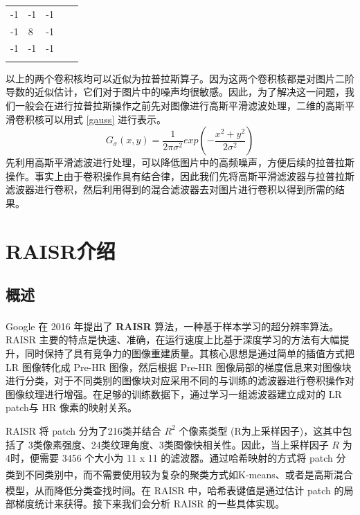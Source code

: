 \documentclass[12pt, a4paper, oneside]{ctexbook}
\begin{document}
	\begin{table}[h]
		\centering
		\begin{tabular}{lllll}
			\cline{1-3}
			\multicolumn{1}{|l|}{-1} & \multicolumn{1}{l|}{-1} & \multicolumn{1}{l|}{-1} &  &  \\ \cline{1-3}
			\multicolumn{1}{|l|}{-1} & \multicolumn{1}{l|}{8}  & \multicolumn{1}{l|}{-1} &  &  \\ \cline{1-3}
			\multicolumn{1}{|l|}{-1} & \multicolumn{1}{l|}{-1} & \multicolumn{1}{l|}{-1} &  &  \\ \cline{1-3}
			&                         &                         &  & 
		\end{tabular}
	\end{table}
	以上的两个卷积核均可以近似为拉普拉斯算子。因为这两个卷积核都是对图片二阶导数的近似估计，它们对于图片中的噪声均很敏感。因此，为了解决这一问题，我们一般会在进行拉普拉斯操作之前先对图像进行高斯平滑滤波处理，二维的高斯平滑卷积核可以用式 \ref{gauss} 进行表示。
	\begin{equation}	\label{gauss}
		G_\sigma (x,y)=\frac{1}{2\pi \sigma ^2} exp(-\frac{x^2+y^2}{2\sigma ^2}) 
	\end{equation}
	先利用高斯平滑滤波进行处理，可以降低图片中的高频噪声，方便后续的拉普拉斯操作。事实上由于卷积操作具有结合律，因此我们先将高斯平滑滤波器与拉普拉斯滤波器进行卷积，然后利用得到的混合滤波器去对图片进行卷积以得到所需的结果。
	\section{RAISR介绍}
	\subsection{概述}
	Google 在 2016 年提出了 \textbf{RAISR}\textsuperscript{\cite{1}} 算法，一种基于样本学习的超分辨率算法。RAISR 主要的特点是快速、准确，在运行速度上比基于深度学习的方法有大幅提升，同时保持了具有竞争力的图像重建质量。其核心思想是通过简单的插值方式把 LR 图像转化成 Pre-HR 图像，然后根据 Pre-HR 图像局部的梯度信息来对图像块进行分类，对于不同类别的图像块对应采用不同的与训练的滤波器进行卷积操作对图像纹理进行增强。在足够的训练数据下，通过学习一组滤波器建立成对的 LR patch与 HR 像素的映射关系。\par RAISR 将 patch 分为了216类并结合 $R^2$ 个像素类型 (R为上采样因子)，这其中包括了 3类像素强度、24类纹理角度、3类图像快相关性。因此，当上采样因子 $R$ 为4时，便需要 3456 个大小为 11 x 11 的滤波器。通过哈希映射的方式将 patch 分类到不同类别中，而不需要使用较为复杂的聚类方式如K-means\textsuperscript{\cite{2}}、或者是高斯混合模型\textsuperscript{\cite{3}}，从而降低分类查找时间。在 RAISR 中，哈希表键值是通过估计 patch 的局部梯度统计来获得。接下来我们会分析 RAISR 的一些具体实现。
\end{document}
